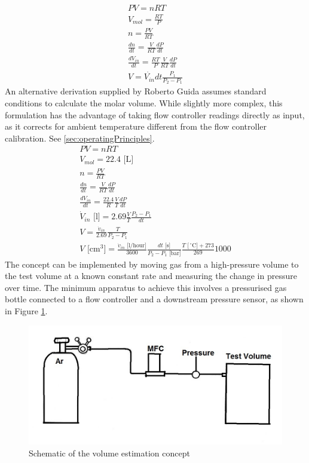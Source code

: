 \documentclass{report}
\begin{document}
\begin{eqnarray}
PV = nRT \label{ideal}\\
V_{mol} = \frac{RT}{P} \label{molarVolume}\\
n = \frac{PV}{RT} \nonumber \\
\frac{dn}{dt} =  \frac {V}{RT} \frac {dP}{dt} \nonumber \\
\frac{dV_{in}}{dt} =  \frac{RT}{P} \frac {V}{RT} \frac {dP}{dt} \nonumber \\
V = \dot{V_{in}} dt \frac{P_1}{P_2 - P_1} \label{tym}
\end{eqnarray}
An alternative derivation supplied by Roberto Guida assumes standard conditions to calculate the molar volume. While slightly more complex, this formulation has the advantage of taking flow controller readings directly as input, as it corrects for ambient temperature different from the flow controller calibration. See \ref{sec:operatingPrinciples}.
\begin{eqnarray}
PV = nRT \nonumber\\
V_{mol} = 22.4 \text{ [L]}\\
n = \frac{PV}{RT} \nonumber \\
\frac{dn}{dt} =  \frac {V}{RT} \frac {dP}{dt} \nonumber \\
\frac{dV_{in}}{dt} =  \frac{22.4}{R} \frac {V}{T} \frac {dP}{dt} \nonumber \\
\dot{V}_{in}\text{ [l]} = 2.69\frac{V}{T} \frac{P_2 - P_1}{dt} \nonumber \\
V = \frac{\dot{v}_{in}}{2.69} \frac{T}{P_2 - P_1}\nonumber \\
V\text{ [cm$^3$]} = \frac{\dot{v}_{in}\text{ [l/hour]}}{3600}\frac{dt\text{ [s]}}{P_2-P_1 \text{ [bar]}}\frac{T\text{ [$\,^{\circ}\mathrm{C}$]}+273}{269}1000 \label{roberto}
\end{eqnarray}
The concept can be implemented by moving gas from a high-pressure volume to the test volume at a known constant rate and measuring the change in pressure over time. The minimum apparatus to achieve this involves a pressurised gas bottle connected to a flow controller and a downstream pressure sensor, as shown in Figure \ref{schematic}.
\begin{figure}[h]
\includegraphics[width=\textwidth]{schematic}
\caption{Schematic of the volume estimation concept}
\label{schematic}
\end{figure}
\\
\end{document}
